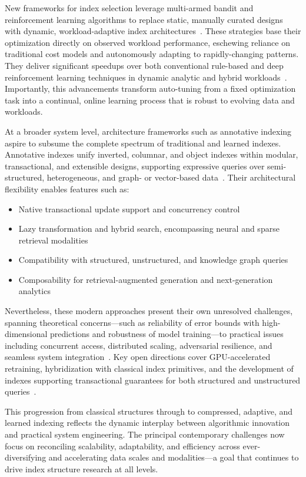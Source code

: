 New frameworks for index selection leverage multi-armed bandit and reinforcement learning algorithms to replace static, manually curated designs with dynamic, workload-adaptive index architectures~\cite{ref105}. These strategies base their optimization directly on observed workload performance, eschewing reliance on traditional cost models and autonomously adapting to rapidly-changing patterns. They deliver significant speedups over both conventional rule-based and deep reinforcement learning techniques in dynamic analytic and hybrid workloads~\cite{ref105}. Importantly, this advancements transform auto-tuning from a fixed optimization task into a continual, online learning process that is robust to evolving data and workloads.

At a broader system level, architecture frameworks such as annotative indexing aspire to subsume the complete spectrum of traditional and learned indexes. Annotative indexes unify inverted, columnar, and object indexes within modular, transactional, and extensible designs, supporting expressive queries over semi-structured, heterogeneous, and graph- or vector-based data~\cite{ref112}. Their architectural flexibility enables features such as:
\begin{itemize}
    \item Native transactional update support and concurrency control
    \item Lazy transformation and hybrid search, encompassing neural and sparse retrieval modalities
    \item Compatibility with structured, unstructured, and knowledge graph queries
    \item Composability for retrieval-augmented generation and next-generation analytics
\end{itemize}

Nevertheless, these modern approaches present their own unresolved challenges, spanning theoretical concerns---such as reliability of error bounds with high-dimensional predictions and robustness of model training---to practical issues including concurrent access, distributed scaling, adversarial resilience, and seamless system integration~\cite{ref105,ref110,ref111,ref112}. Key open directions cover GPU-accelerated retraining, hybridization with classical index primitives, and the development of indexes supporting transactional guarantees for both structured and unstructured queries~\cite{ref111,ref112}.

This progression from classical structures through to compressed, adaptive, and learned indexing reflects the dynamic interplay between algorithmic innovation and practical system engineering. The principal contemporary challenges now focus on reconciling scalability, adaptability, and efficiency across ever-diversifying and accelerating data scales and modalities---a goal that continues to drive index structure research at all levels.


